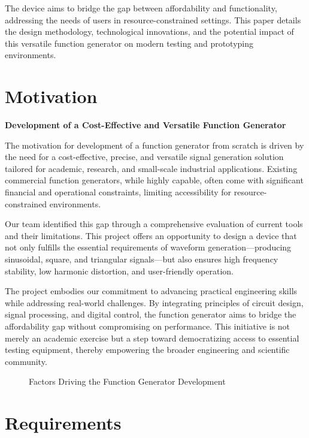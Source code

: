 \documentclass[a4paper,12pt]{article}
\begin{document}
The device aims to bridge the gap between affordability and functionality, addressing the needs of users in resource-constrained settings. This paper details the design methodology, technological innovations, and the potential impact of this versatile function generator on modern testing and prototyping environments.



\newpage
\section{Motivation}
{\large\textbf{Development of a Cost-Effective and Versatile Function Generator}\par}

The motivation for development of a function generator from scratch is driven by the need for a cost-effective, precise, and versatile signal generation solution tailored for academic, research, and small-scale industrial applications. Existing commercial function generators, while highly capable, often come with significant financial and operational constraints, limiting accessibility for resource-constrained environments.

Our team identified this gap through a comprehensive evaluation of current tools and their limitations. This project offers an opportunity to design a device that not only fulfills the essential requirements of waveform generation—producing sinusoidal, square, and triangular signals—but also ensures high frequency stability, low harmonic distortion, and user-friendly operation.

The project embodies our commitment to advancing practical engineering skills while addressing real-world challenges. By integrating principles of circuit design, signal processing, and digital control, the function generator aims to bridge the affordability gap without compromising on performance. This initiative is not merely an academic exercise but a step toward democratizing access to essential testing equipment, thereby empowering the broader engineering and scientific community.

\begin{figure}[H]
    \centering 
    
    \caption{Factors Driving the Function Generator Development}
    \label{fig:motivation}
\end{figure}


\newpage
\section{Requirements}
\end{document}
